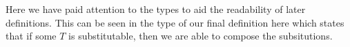 \begin{code}%
\>[0]\AgdaSpace{}%
\AgdaSymbol{:}\AgdaSpace{}%
\AgdaSpace{}%
\AgdaSpace{}%
\AgdaSpace{}%
\AgdaSpace{}%
\AgdaOperator{\AgdaFunction{\AgdaUnderscore{}⇒[}}\AgdaSpace{}%
\AgdaSpace{}%
\AgdaOperator{\AgdaFunction{]\AgdaUnderscore{}}}\<%
\\
\>[0]\AgdaOperator{\AgdaFunction{[}}\AgdaSpace{}%
\AgdaBound{/}\AgdaSpace{}%
\AgdaOperator{\AgdaFunction{]}}%
\>[7]%
\>[15]\AgdaSpace{}%
\AgdaSpace{}%
\AgdaSymbol{=}\AgdaSpace{}%
\<%
\\
\>[0]\AgdaOperator{\AgdaFunction{[}}\AgdaSpace{}%
\AgdaBound{/}\AgdaSpace{}%
\AgdaOperator{\AgdaFunction{]}}\AgdaSpace{}%
\AgdaSymbol{(}\AgdaSpace{}%
\AgdaOperator{\AgdaInductiveConstructor{-,}}\AgdaSpace{}%
\AgdaSymbol{)}\AgdaSpace{}%
\AgdaSpace{}%
\AgdaSpace{}%
\AgdaSymbol{=}\AgdaSpace{}%
\AgdaSymbol{(}\AgdaOperator{\AgdaFunction{[}}\AgdaSpace{}%
\AgdaBound{/}\AgdaSpace{}%
\AgdaOperator{\AgdaFunction{]}}\AgdaSpace{}%
\AgdaSpace{}%
\AgdaSpace{}%
\AgdaSymbol{)}\AgdaSpace{}%
\AgdaOperator{\AgdaInductiveConstructor{-,}}\AgdaSpace{}%
\AgdaBound{/}\AgdaSpace{}%
\AgdaSpace{}%
\<%
\end{code}
Here we have paid attention to the types to aid the readability of
later definitions. This can be seen in the type of our final definition here
which states that if some $T$ is substitutable, then we are able to compose
the subsitutions.
